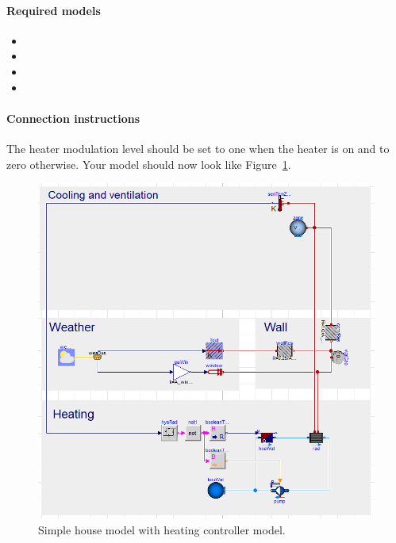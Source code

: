 \documentclass[10pt,a4paper]{article}
\begin{document}
\paragraph{Required models}
\begin{itemize}
\item {}
\item {}
\item {}
\item {}
\end{itemize}

\paragraph{Connection instructions}
The heater modulation level should be set to one when the heater is on and to zero otherwise. Your model should now look like Figure~\ref{fig:heatingControllerModel}.
\begin{figure}[h]
\centering
\includegraphics[scale=0.4]{heatingControllerModel.png}
\caption{Simple house model with heating controller model.}
\label{fig:heatingControllerModel}
\end{figure} 
\end{document}
